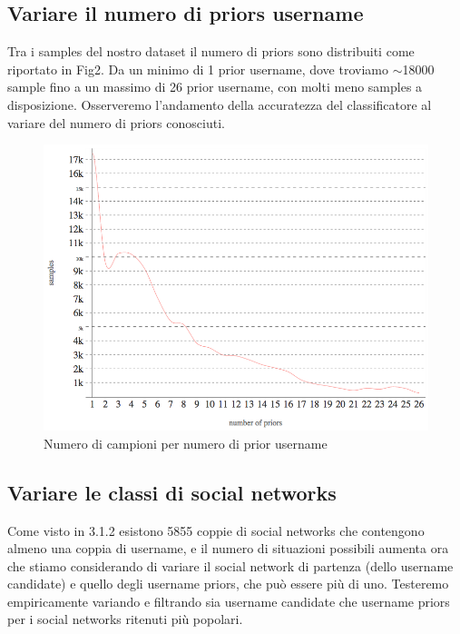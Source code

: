 \subsection{Variare il numero di priors username}
Tra i samples del nostro dataset il numero di priors sono distribuiti come riportato in Fig2. Da un minimo di 1 prior username, dove troviamo $\sim$18000 sample fino a un massimo di 26 prior username, con molti meno samples a disposizione. Osserveremo l'andamento della accuratezza del classificatore al variare del numero di priors conosciuti.

\begin{figure}[bp!]
\centering
\includegraphics[width=130mm]{chapters/plots/priors_distribution.png}
\caption{Numero di campioni per numero di prior username  \label{overflow}}
\end{figure}

\subsection{Variare le classi di social networks}
Come visto in 3.1.2 esistono 5855 coppie di social networks che contengono almeno una coppia di username, e il numero di situazioni possibili aumenta ora che stiamo considerando di variare il social network di partenza (dello username candidate) e quello degli username priors, che può essere più di uno. Testeremo empiricamente variando e filtrando sia username candidate che username priors per i social networks ritenuti più popolari.

